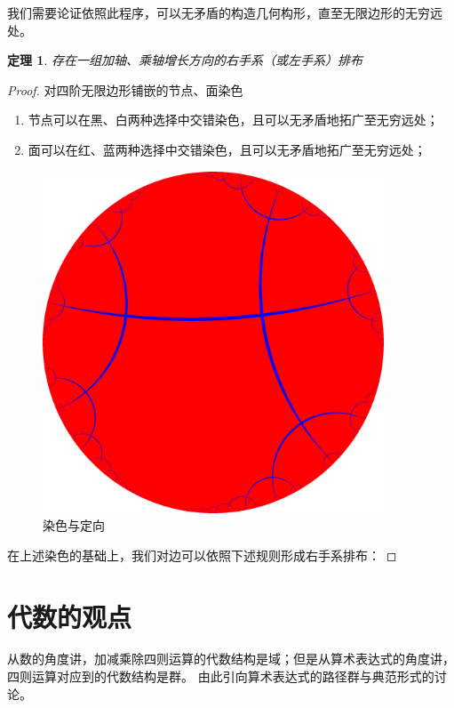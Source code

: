 \documentclass[a4paper,12pt]{article}
\numberwithin{definition}{section}
\numberwithin{lemma}{section}
\numberwithin{proposition}{section}
\newtheorem{theorem}{定理}
\numberwithin{theorem}{section}
\numberwithin{grammar}{section}
\numberwithin{program}{section}
\numberwithin{convention}{section}
\numberwithin{corollary}{section}
\begin{document}
我们需要论证依照此程序，可以无矛盾的构造几何构形，直至无限边形的无穷远处。

\begin{theorem}
    存在一组加轴、乘轴增长方向的右手系（或左手系）排布
\end{theorem}

\begin{proof}
对四阶无限边形铺嵌的节点、面染色
\begin{enumerate}
    \item 节点可以在黑、白两种选择中交错染色，且可以无矛盾地拓广至无穷远处；
    \item 面可以在红、蓝两种选择中交错染色，且可以无矛盾地拓广至无穷远处；
\end{enumerate}

\begin{figure}[ht]
\centering
\includegraphics[width=4in]{images/H2_tiling_24i-1.png}
\caption{染色与定向}
\end{figure}

在上述染色的基础上，我们对边可以依照下述规则形成右手系排布：

\end{proof}

\newpage

\section{代数的观点}

从数的角度讲，加减乘除四则运算的代数结构是域；但是从算术表达式的角度讲，四则运算对应到的代数结构是群。
由此引向算术表达式的路径群与典范形式的讨论。
\end{document}

